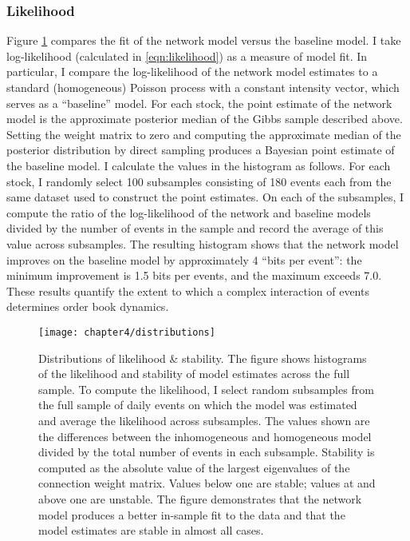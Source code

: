 		\subsubsection{Likelihood}
			Figure \ref{fig:distributions} compares the fit of the network model versus the baseline model. I take log-likelihood (calculated in \eqref{eqn:likelihood}) as a measure of model fit. In particular, I compare the log-likelihood of the network model estimates to a standard (homogeneous) Poisson process with a constant intensity vector, which serves as a “baseline” model. For each stock, the point estimate of the network model is the approximate posterior median of the Gibbs sample described above. Setting the weight matrix to zero and computing the approximate median of the posterior distribution by direct sampling produces a Bayesian point estimate of the baseline model. I calculate the values in the histogram as follows. For each stock, I randomly select 100 subsamples consisting of 180 events each from the same dataset used to construct the point estimates. On each of the subsamples, I compute the ratio of the log-likelihood of the network and baseline models divided by the number of events in the sample and record the average of this value across subsamples. The resulting histogram shows that the network model improves on the baseline model by approximately 4 ``bits per event'': the minimum improvement is 1.5 bits per events, and the maximum exceeds 7.0. These results quantify the extent to which a complex interaction of events determines order book dynamics.

			\begin{figure}[p]
				\small
				\linespread{1}
				\centering
				\texttt{[image: chapter4/distributions]}
				\captionsetup{skip=-20pt, position=below, font=footnotesize, justification=justified, width=\linewidth}
				\caption[Distributions of likelihood \& stability]{Distributions of likelihood \& stability. The figure shows histograms of the likelihood and stability of model estimates across the full sample. To compute the likelihood, I select random subsamples from the full sample of daily events on which the model was estimated and average the likelihood across subsamples. The values shown are the differences between the inhomogeneous and homogeneous model divided by the total number of events in each subsample. Stability is computed as the absolute value of the largest eigenvalues of the connection weight matrix. Values below one are stable; values at and above one are unstable.  The figure demonstrates that the network model produces a better in-sample fit to the data and that the model estimates are stable in almost all cases.}
				\label{fig:distributions}
			\end{figure}

